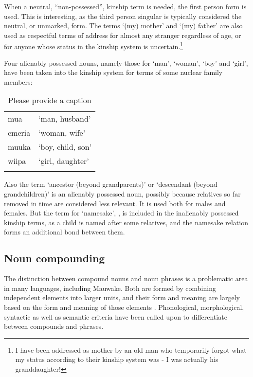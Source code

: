 When a neutral, ``non-possessed'', kinship term is needed, the first person form is used. This is interesting, as the third person singular is typically considered the neutral, or unmarked, form. The terms `(my) mother' and `(my) father' are also used as respectful terms of address for almost any stranger regardless of age, or for anyone whose status in the kinship system is uncertain.\footnote{I have been addressed as {\textquotedbl}mother{\textquotedbl} by an old man who temporarily forgot what my status according to their kinship system was - I was actually his granddaughter!}

Four alienably possessed nouns, namely those for `man', `woman', `boy' and `girl', have been taken into the kinship system for terms of some nuclear family members: 

\begin{table}
\caption{Please provide a caption}
\label{}
\begin{tabular}{ll}
\mytoprule
mua &`man, husband'\\
emeria &`woman, wife'\\
muuka &`boy, child, son'\\
wiipa &`girl, daughter'\\
\mybottomrule
\end{tabular}
\end{table}


Also the term  `ancestor (beyond grandparents)' or `descendant (beyond grandchildren)' is an alienably possessed noun, possibly because relatives so far removed in time are considered less relevant. It is used both for males and females. But the term for `namesake', , is included in the inalienably possessed kinship terms, as a child is named after some relatives, and the namesake relation forms an additional bond between them.

\subsection{Noun compounding}\label{sec:3:2:5}
{}
The distinction between compound nouns and noun phrases is a problematic area in many languages, including Mauwake. Both are formed by combining independent elements into larger units, and their form and meaning are largely based on the form and meaning of those elements \citep[40]{Anderson1985a}. Phonological, morphological, syntactic as well as semantic criteria have been called upon to differentiate between compounds and phrases.

